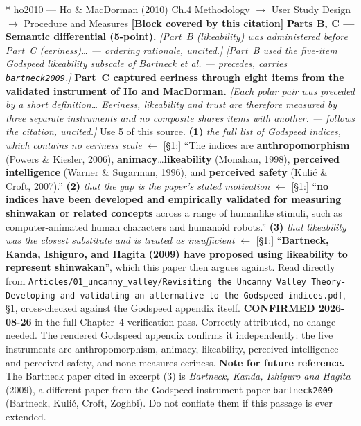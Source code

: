 \documentclass[11pt, a4paper]{article}
\makeatletter
\newcounter{citentry}
\newcommand{\citentry@core}[7]{%
  \stepcounter{citentry}
  \begingroup
  \sbox{\citentry@measurebox}{%
    \begin{minipage}{\linewidth}
      \noindent\colorbox{konstanzblue}{\parbox{\dimexpr\linewidth-2\fboxsep}{%
        \vspace{3pt}
        \textbf{\#\thecitentry \quad #2} \hfill \textit{#3}
        \vspace{3pt}
      }}
      \vspace{3pt}
      \noindent\begin{tabular}{@{}p{2.7cm} p{\dimexpr\linewidth-3cm}@{}}
        \textit{\small Sentence in thesis:} & #4 \\[5pt]
        \textbf{Usage:}\hfill       & #5 \\[5pt]
        \textit{\small Original source:}     & #6 \\[5pt]
        \textbf{How to check:}             & #7 \\
      \end{tabular}
      \vspace{5pt}
      \rule{10pt}{10pt}\quad \textbf{Validated} --- I have read the original and agree it supports the sentence.
    \end{minipage}%
  }%
  \Needspace{\dimexpr\ht\citentry@measurebox+\dp\citentry@measurebox\relax}%
  \endgroup
  \vspace{10pt}
  \noindent\colorbox{konstanzblue}{\parbox{\dimexpr\linewidth-2\fboxsep}{%
    \vspace{3pt}
    \textcolor{white}{\textbf{\#\thecitentry \quad #2}} \hfill \textcolor{white}{\textit{#3}}
    \vspace{3pt}
  }}
  \vspace{3pt}
  \noindent\begin{tabular}{@{}p{2.7cm} p{\dimexpr\linewidth-3cm}@{}}
    \textit{\small Sentence in thesis:} & \textcolor{darkgreen}{#4} \\[5pt]
    \textbf{Usage:}\hfill       & #5 \\[5pt]
    \textit{\small Original source:}     & \textcolor{darkred}{#6} \\[5pt]
    \textbf{How to check:}             & #7 \\
  \end{tabular}
  \vspace{5pt}
  \noindent\CheckBox[name=verified\thecitentry, width=10pt, height=10pt, bordercolor={0 0 0}, borderwidth=0.75, backgroundcolor={1 1 1}#1]{}\quad \textbf{Validated} --- I have read the original and agree it supports the sentence.
  \vspace{3pt}
  \noindent\textcolor{midgray}{\rule{\linewidth}{0.4pt}}
}
\newcommand{\citentry}{\@ifstar{\citentry@core{, checked}}{\citentry@core{}}}
\makeatother
\begin{document}
\begin{Form}
\citentry*
  {ho2010 --- Ho \& MacDorman (2010)}
  {Ch.4 Methodology $\rightarrow$ User Study Design $\rightarrow$ Procedure and Measures}
  {\textbf{[Block covered by this citation]} \textbf{Parts B, C — Semantic differential (5-point).} \emph{[Part~B (likeability) was administered before Part~C (eeriness)\ldots{} --- ordering rationale, uncited.]} \emph{[Part~B used the five-item Godspeed likeability subscale of Bartneck et al. --- precedes, carries \texttt{bartneck2009}.]} \textbf{Part~C captured eeriness through eight items from the validated instrument of Ho and MacDorman.} \emph{[Each polar pair was preceded by a short definition\ldots{} Eeriness, likeability and trust are therefore measured by three separate instruments and no composite shares items with another. --- follows the citation, uncited.]}}
  {Use 5 of this source.}
  {\textbf{(1)} \emph{the full list of Godspeed indices, which contains no eeriness scale} $\leftarrow$ [\S1:] ``The indices are \textbf{anthropomorphism} (Powers \& Kiesler, 2006), \textbf{animacy}\ldots \textbf{likeability} (Monahan, 1998), \textbf{perceived intelligence} (Warner \& Sugarman, 1996), and \textbf{perceived safety} (Kuli\'{c} \& Croft, 2007).'' \quad \textbf{(2)} \emph{that the gap is the paper's stated motivation} $\leftarrow$ [\S1:] ``\textbf{no indices have been developed and empirically validated for measuring shinwakan or related concepts} across a range of humanlike stimuli, such as computer-animated human characters and humanoid robots.'' \quad \textbf{(3)} \emph{that likeability was the closest substitute and is treated as insufficient} $\leftarrow$ [\S1:] ``\textbf{Bartneck, Kanda, Ishiguro, and Hagita (2009) have proposed using likeability to represent shinwakan}'', which this paper then argues against.}
  {Read directly from \texttt{\footnotesize Articles/01\_uncanny\_valley/Revisiting the Uncanny Valley Theory- Developing and validating an alternative to the Godspeed indices.pdf}, \S1, cross-checked against the Godspeed appendix itself. \textbf{CONFIRMED 2026-08-26} in the full Chapter~4 verification pass. Correctly attributed, no change needed. The rendered Godspeed appendix confirms it independently: the five instruments are anthropomorphism, animacy, likeability, perceived intelligence and perceived safety, and none measures eeriness. \textbf{Note for future reference.} The Bartneck paper cited in excerpt (3) is \emph{Bartneck, Kanda, Ishiguro and Hagita} (2009), a different paper from the Godspeed instrument paper \texttt{bartneck2009} (Bartneck, Kuli\'{c}, Croft, Zoghbi). Do not conflate them if this passage is ever extended.}


\end{Form}
\end{document}
